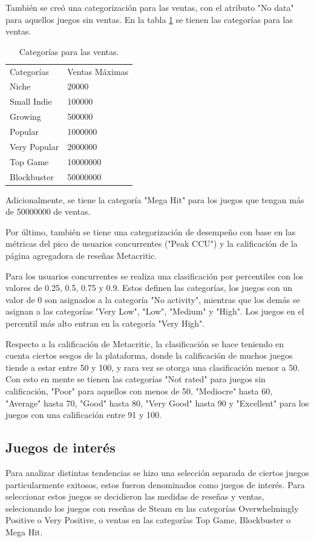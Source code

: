 \documentclass[conference]{IEEEtran}
\begin{document}
También se creó una categorización para las ventas, con el atributo "No data" para aquellos juegos sin ventas. En la tabla \ref{table_2} se tienen las categorías para las ventas.

\begin{table}[]
\begin{tabular}{ll}
Categorías        & Ventas Máximas   \\
Niche             & 20000            \\
Small Indie       & 100000           \\
Growing           & 500000           \\
Popular           & 1000000          \\
Very Popular      & 2000000          \\
Top Game          & 10000000         \\
Blockbuster       & 50000000        
\end{tabular}
\caption{Categorías para las ventas.}
\label{table_2}
\end{table}

Adicionalmente, se tiene la categoría "Mega Hit" para los juegos que tengan más de 50000000 de ventas.

Por último, también se tiene una categorización de desempeño con base en las métricas del pico de usuarios concurrentes ("Peak CCU") y la calificación de la página agregadora de reseñas Metacritic.

Para los usuarios concurrentes se realiza una clasificación por percentiles con los valores de 0.25, 0.5, 0.75 y 0.9. Estos definen las categorías, los juegos con un valor de 0 son asignados a la categoría "No activity", mientras que los demás se asignan a las categorías "Very Low", "Low", "Medium" y "High". Los juegos en el percentil más alto entran en la categoría "Very High".

Respecto a la calificación de Metacritic, la clasificación se hace teniendo en cuenta ciertos sesgos de la plataforma, donde la calificación de muchos juegos tiende a estar entre 50 y 100, y rara vez se otorga una clasificación menor a 50. Con esto en mente se tienen las categorías "Not rated" para juegos sin calificación, "Poor" para aquellos con menos de 50, "Mediocre" hasta 60, "Average" hasta 70, "Good" hasta 80, "Very Good" hasta 90 y "Excellent" para los juegos con una calificación entre 91 y 100.

\subsection{Juegos de interés}
Para analizar distintas tendencias se hizo una selección separada de ciertos juegos particularmente exitosos, estos fueron denominados como juegos de interés. Para seleccionar estos juegos se decidieron las medidas de reseñas y ventas, selecionando los juegos con reseñas de Steam en las categorías Overwhelmingly Positive o Very Positive, o ventas en las categorías Top Game, Blockbuster o Mega Hit.
\end{document}
